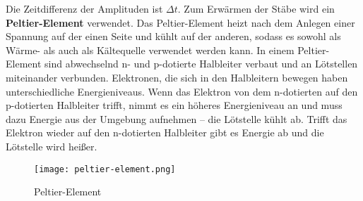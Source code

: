 Die Zeitdifferenz der Amplituden ist $\Delta t$. \newpage
Zum Erwärmen der Stäbe wird ein \textbf{Peltier-Element} verwendet. Das Peltier-Element heizt nach dem Anlegen einer Spannung auf der einen Seite und kühlt auf der anderen, sodass es sowohl als Wärme- als auch als Kältequelle verwendet werden kann. In einem Peltier-Element sind abwechselnd n- und p-dotierte Halbleiter verbaut und an Lötstellen miteinander verbunden. Elektronen, die sich in den Halbleitern bewegen haben unterschiedliche Energieniveaus. Wenn das Elektron von dem n-dotierten auf den p-dotierten Halbleiter trifft, nimmt es ein höheres Energieniveau an und muss dazu Energie aus der Umgebung aufnehmen -- die Lötstelle kühlt ab. Trifft  das Elektron wieder auf den n-dotierten Halbleiter gibt es Energie ab und die Lötstelle wird heißer.
\begin{figure}
	\centering
\texttt{[image: peltier-element.png]}		
\caption[Peltier-Element]{Peltier-Element\footnotemark}
\end{figure}


